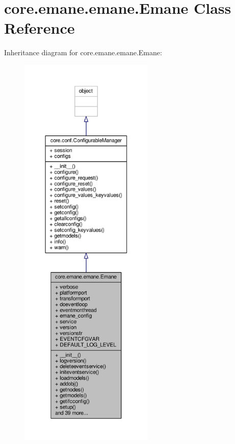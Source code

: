 \hypertarget{classcore_1_1emane_1_1emane_1_1_emane}{\section{core.\+emane.\+emane.\+Emane Class Reference}
\label{classcore_1_1emane_1_1emane_1_1_emane}
}


Inheritance diagram for core.\+emane.\+emane.\+Emane\+:
\nopagebreak
\begin{figure}[H]
\begin{center}
\leavevmode
\includegraphics[height=550pt]{classcore_1_1emane_1_1emane_1_1_emane__inherit__graph}
\end{center}
\end{figure}


